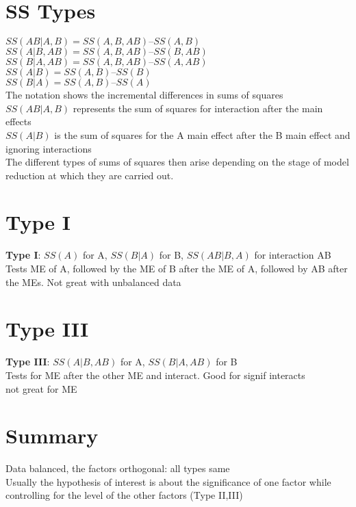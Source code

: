 \documentclass{article}
\begin{document}
\begin{flushleft}
\section*{SS Types}
$SS(AB | A, B) = SS(A, B, AB) – SS(A, B)$\\
$SS(A | B, AB) = SS(A, B, AB) – SS(B, AB)$\\
$SS(B | A, AB) = SS(A, B, AB) – SS(A, AB)$\\
$SS(A | B) = SS(A, B) – SS(B)$\\
$SS(B | A) = SS(A, B) – SS(A)$\\

The notation shows the incremental differences in sums of squares\\  
$SS(AB | A, B)$ represents the sum of squares for interaction after the main effects\\ 
$SS(A | B)$ is the sum of squares for the A main effect after the B main effect and ignoring interactions\\

The different types of sums of squares then arise depending on the stage of model reduction at which they are carried out.\\


\section*{Type I}
\textbf{Type I}: $SS(A)$ for A, $SS(B | A)$ for B,
$SS(AB | B, A)$ for interaction AB\\
Tests  ME of A, followed by the ME of B after the ME of A, followed by AB after the MEs. Not great with unbalanced data\\
\section*{Type III}
\textbf{Type III}: $SS(A | B, AB)$ for A, $SS(B | A, AB)$ for B\\
Tests for ME after the other ME and interact. Good for signif interacts\\
not great for ME\\
\section*{Summary}
Data balanced, the factors orthogonal: all types same\\
Usually the hypothesis of interest is about the significance of one factor while controlling for the level of the other factors (Type II,III)\\

\end{flushleft}
\end{document}
